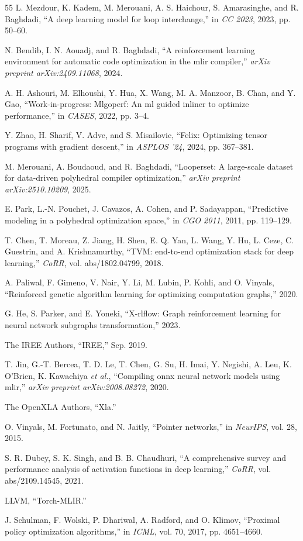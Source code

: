 \documentclass[10pt,twocolumn]{article}
\begin{document}
\begin{thebibliography}{55}
 L. Mezdour, K. Kadem, M. Merouani, A. S. Haichour, S. Amarasinghe, and R. Baghdadi, ``A deep learning model for loop interchange,'' in \emph{CC 2023}, 2023, pp. 50--60.

 N. Bendib, I. N. Aouadj, and R. Baghdadi, ``A reinforcement learning environment for automatic code optimization in the mlir compiler,'' \emph{arXiv preprint arXiv:2409.11068}, 2024.

 A. H. Ashouri, M. Elhoushi, Y. Hua, X. Wang, M. A. Manzoor, B. Chan, and Y. Gao, ``Work-in-progress: Mlgoperf: An ml guided inliner to optimize performance,'' in \emph{CASES}, 2022, pp. 3--4.

 Y. Zhao, H. Sharif, V. Adve, and S. Misailovic, ``Felix: Optimizing tensor programs with gradient descent,'' in \emph{ASPLOS '24}, 2024, pp. 367--381.

 M. Merouani, A. Boudaoud, and R. Baghdadi, ``Looperset: A large-scale dataset for data-driven polyhedral compiler optimization,'' \emph{arXiv preprint arXiv:2510.10209}, 2025.

 E. Park, L.-N. Pouchet, J. Cavazos, A. Cohen, and P. Sadayappan, ``Predictive modeling in a polyhedral optimization space,'' in \emph{CGO 2011}, 2011, pp. 119--129.

 T. Chen, T. Moreau, Z. Jiang, H. Shen, E. Q. Yan, L. Wang, Y. Hu, L. Ceze, C. Guestrin, and A. Krishnamurthy, ``TVM: end-to-end optimization stack for deep learning,'' \emph{CoRR}, vol. abs/1802.04799, 2018.

 A. Paliwal, F. Gimeno, V. Nair, Y. Li, M. Lubin, P. Kohli, and O. Vinyals, ``Reinforced genetic algorithm learning for optimizing computation graphs,'' 2020.

 G. He, S. Parker, and E. Yoneki, ``X-rlflow: Graph reinforcement learning for neural network subgraphs transformation,'' 2023.

 The IREE Authors, ``IREE,'' Sep. 2019.

 T. Jin, G.-T. Bercea, T. D. Le, T. Chen, G. Su, H. Imai, Y. Negishi, A. Leu, K. O'Brien, K. Kawachiya \emph{et al.}, ``Compiling onnx neural network models using mlir,'' \emph{arXiv preprint arXiv:2008.08272}, 2020.

 The OpenXLA Authors, ``Xla.''

 O. Vinyals, M. Fortunato, and N. Jaitly, ``Pointer networks,'' in \emph{NeurIPS}, vol. 28, 2015.

 S. R. Dubey, S. K. Singh, and B. B. Chaudhuri, ``A comprehensive survey and performance analysis of activation functions in deep learning,'' \emph{CoRR}, vol. abs/2109.14545, 2021.

 LLVM, ``Torch-MLIR.''

 J. Schulman, F. Wolski, P. Dhariwal, A. Radford, and O. Klimov, ``Proximal policy optimization algorithms,'' in \emph{ICML}, vol. 70, 2017, pp. 4651--4660.

\end{thebibliography}
\end{document}
